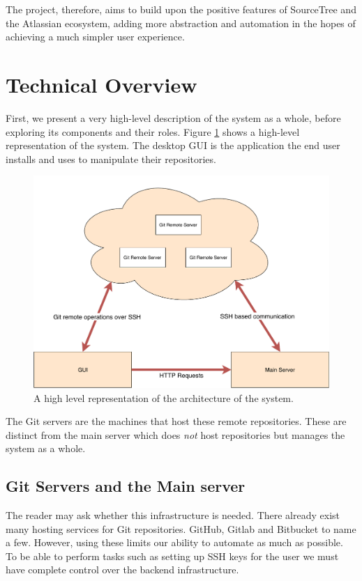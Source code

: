The project, therefore, aims to build upon the positive features of SourceTree and the Atlassian ecosystem, adding more abstraction and automation in the hopes of achieving a much simpler user experience.

\section{Technical Overview}

First, we present a very high-level description of the system as a whole, before exploring its components and their roles. Figure \ref{fig:highlevel} shows a high-level representation of the system. The desktop GUI is the application the end user installs and uses to manipulate their repositories.

\begin{figure} 
    \centering
    \includegraphics[scale = 0.5]{figures/highlevel.pdf}
    \caption{A high level representation of the architecture of the system. }
    \label{fig:highlevel}
\end{figure}

The Git servers are the machines that host these remote repositories. These are distinct from the main server which does \emph{not} host repositories but manages the system as a whole.

\subsection{Git Servers and the Main server}

The reader may ask whether this infrastructure is needed. There already exist many hosting services for Git repositories. GitHub, Gitlab and Bitbucket to name a few. However, using these limits our ability to automate as much as possible. To be able to perform tasks such as setting up SSH keys for the user we must have complete control over the backend infrastructure. 

